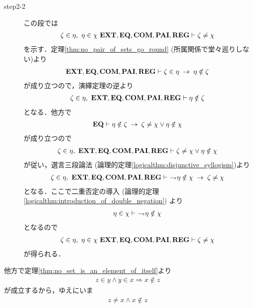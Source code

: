 \begin{sketch}
\begin{description}
\begin{description}
					\item[step2-2] この段では
						\begin{align}
							\zeta \in \eta,\ \eta \in \chi\ 
							\EXTAX,\EQAX,\COMAX,\PAIAX,\REGAX 
							\vdash \zeta \neq \chi
						\end{align}
						を示す．定理\ref{thm:no_pair_of_sets_go_round}
						(所属関係で堂々巡りしない)より
						\begin{align}
							\mbox{{\bf EXT}},\mbox{{\bf EQ}},\mbox{\bf COM},\mbox{{\bf PAI}},\mbox{{\bf REG}} \vdash 
							\zeta \in \eta \hspace{0.25em}\rightarrow\hspace{0.25em} \eta \notin \zeta
						\end{align}
						が成り立つので，演繹定理の逆より
						\begin{align}
							\zeta \in \eta,\ \EXTAX,\EQAX,\COMAX,\PAIAX,\REGAX 
							\vdash \eta \notin \zeta
						\end{align}
						となる．他方で
						\begin{align}
							\mbox{{\bf EQ}} \vdash \eta \notin \zeta 
							\hspace{0.25em}\rightarrow\hspace{0.25em} \zeta \neq \chi \vee \eta \notin \chi
						\end{align}
						が成り立つので
						\begin{align}
							\zeta \in \eta,\ \EXTAX,\EQAX,\COMAX,\PAIAX,\REGAX 
							\vdash \zeta \neq \chi \vee \eta \notin \chi
						\end{align}
						が従い，選言三段論法
						(論理的定理\ref{logicalthm:disjunctive_syllogism})より
						\begin{align}
							\zeta \in \eta,\ \EXTAX,\EQAX,\COMAX,\PAIAX,\REGAX 
							\vdash\ \negation \eta \notin \chi
							\rarrow \zeta \neq \chi
						\end{align}
						となる．ここで二重否定の導入
						(論理的定理\ref{logicalthm:introduction_of_double_negation})
						より
						\begin{align}
							\eta \in \chi \vdash\ \rightharpoondown\hspace{-0.25em} \eta \notin \chi
						\end{align}
						となるので
						\begin{align}
							\zeta \in \eta,\ \eta \in \chi\ 
							\EXTAX,\EQAX,\COMAX,\PAIAX,\REGAX 
							\vdash \zeta \neq \chi
						\end{align}
						が得られる．
				\end{description}
				他方で定理\ref{thm:no_set_is_an_element_of_itself}より
		\begin{align}
			z \in y \wedge y \in x \Longrightarrow x \notin z
		\end{align}
		が成立するから，ゆえにいま
		\begin{align}
			z \neq x \wedge x \notin z

\end{align}
\end{description}
\end{sketch}

